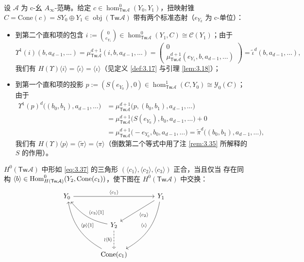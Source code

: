 \begin{Def}\label{def:3.36}
设 $\mathcal A$ 为 c-幺 $A_\infty$-范畴。给定
$c\in\hom^0_{\mathsf{Tw}\mathcal A}(Y_0,Y_1)$，扭映射锥
$C=\mathrm{Cone}(c)=SY_0\oplus Y_1\in\operatorname{obj}(\mathsf{Tw}\mathcal A)$
带有两个标准态射（$e_{Y_k}$ 为 c-单位）：
\begin{itemize}
  \item 到第二个直和项的包含
        $i:=\binom{0}{e_{Y_1}}\in\hom^0_{\mathsf{Tw}\mathcal A}(Y_1,C)
        \cong\mathcal C(Y_1)$；由于
        \[
          \Upsilon^1(i)(b,a_{d-1},\dots)=\mu^{d+1}_{\mathsf{Tw}\mathcal A}
          (i,b,a_{d-1},\dots)=
          \begin{pmatrix}0\\ \mu^{d+1}_{\mathsf{Tw}\mathcal A}
          (e_{Y_1},b,a_{d-1},\dots)\end{pmatrix}
          =\tilde\iota^d(b,a_{d-1},\dots),
        \]
        我们有 $H(\Upsilon)\langle i\rangle=\langle\tilde\iota\rangle=
        \langle\iota\rangle$（见定义 \ref{def:3.17} 与引理 \ref{lem:3.18}）；
  \item 到第一个直和项的投影
        $p:=(S(e_{Y_0}),0)\in\hom^1_{\mathsf{Tw}\mathcal A}(C,Y_0)\cong
        \mathcal Y_0(C)$；由于
        \[
          \begin{aligned}
            \Upsilon^1(p)^d\bigl((b_0,b_1),a_{d-1},\dots\bigr)
            &=\mu^{d+1}_{\mathsf{Tw}\mathcal A}\bigl(p,(b_0,b_1),
            a_{d-1},\dots\bigr)\\
            &=\mu^{d+1}_{\mathsf{Tw}\mathcal A}\bigl(S(e_{Y_0}),b_0,
            a_{d-1},\dots\bigr)+0\\
            &=\mu^{d+1}_{\mathsf{Tw}\mathcal A}\bigl(-e_{Y_0},b_0,
            a_{d-1},\dots\bigr)=\tilde\pi^d\bigl((b_0,b_1),
            a_{d-1},\dots\bigr),
          \end{aligned}
        \]
        我们有 $H(\Upsilon)\langle p\rangle=\langle\tilde\pi\rangle=
        \langle\pi\rangle$（倒数第二个等式中用了注 \ref{rem:3.35} 所解释的
        $S$ 的作用）。
\end{itemize}
\end{Def}

\begin{Lem}\label{lem:3.37}
$H^0(\mathsf{Tw}\mathcal A)$ 中形如 \eqref{eq:3.37} 的三角形
$(\langle c_1\rangle,\langle c_2\rangle,\langle c_3\rangle)$ 正合，当且仅当
存在同构 $\langle b\rangle\in\operatorname{Hom}^0_{H(\mathsf{Tw}\mathcal A)}(Y_2,
\mathrm{Cone}(c_1))$，使下图在 $H^0(\mathsf{Tw}\mathcal A)$ 中交换：
\begin{equation}\label{eq:3.50}
  \begin{tikzcd}[column sep=large, row sep=large]
    Y_0 \arrow[rr, "{\langle c_1\rangle}"] & &
      Y_1 \arrow[dl, "{\langle c_2\rangle}"]
      \arrow[ddl, "{\langle\iota\rangle}"', bend left=25] \\
    & Y_2 \arrow[d, dashed, "{\wr\langle b\rangle}"']
      \arrow[ul, "{\langle c_3\rangle{[}1{]}}"', bend left=20] & & \\
    & \mathrm{Cone}(c_1) \arrow[uul, "{\langle p\rangle{[}1{]}}"',
      bend left=25] & &
  \end{tikzcd}
\end{equation}
\end{Lem}

